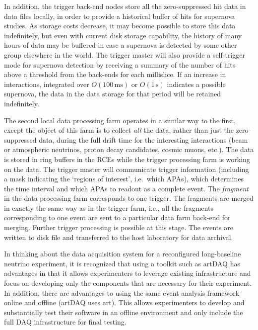 In addition, the trigger back-end nodes store all the zero-suppressed
hit data in data files locally, in order to provide a historical
buffer of hits for supernova studies.  As storage costs decrease, it
may become possible to store this data indefinitely, but even with
current disk storage capability, the history of many hours of data may
be buffered in case a supernova is detected by some other group elsewhere
in the world.  The trigger master will also provide a self-trigger mode
for supernova detection by receiving a summary of the number of hits
above a threshold from the back-ends for each millislice.  If an
increase in interactions, integrated over $O(100\,\mathrm{ms})$ or
$O(1\,\mathrm{s})$ indicates a possible supernova, the data in the
data storage for that period will be retained indefinitely.

The second local data processing farm operates in a similar way to the
first, except the object of this farm is to collect {\it all} the
data, rather than just the zero-suppressed data, during the full drift
time for the interesting interactions (beam or atmospheric neutrinos,
proton decay candidates, cosmic muons, etc.).  The data is stored in
ring buffers in the RCEs while the trigger processing farm is working
on the data.  The trigger master will communicate trigger information
(including a mask indicating the `regions of interest', i.e.\ which
APAs), which determines the time interval and which APAs to readout as a
complete event.  The {\it fragment} in the data processing farm
corresponds to one trigger.  The fragments are merged in exactly the
same way as in the trigger farm, i.e., all the fragments corresponding
to one event are sent to a particular data farm back-end for merging.
Further trigger processing is possible at this stage.  The events are
written to disk file and transferred to the host laboratory for data
archival.

In thinking about the data acquisition system for a reconfigured
long-baseline neutrino experiment, it is recognized that using a
toolkit such as artDAQ has advantages in that it allows experimenters
to leverage existing infrastructure and focus on developing only the components
that are necessary for their experiment.  In addition, there are
advantages to using the same event analysis framework online and
offline (artDAQ uses art).  This allows experimenters to develop and
substantially test their software in an offline environment and only
include the full DAQ infrastructure for final testing.

